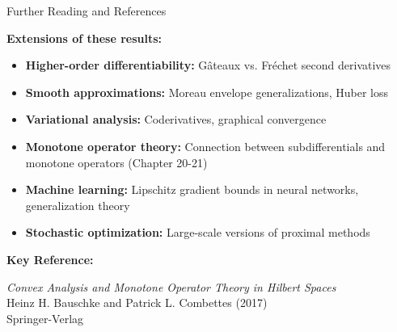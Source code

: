 \documentclass[aspectratio=169,10pt]{beamer}
\theoremstyle{definition}
\begin{document}
\begin{frame}{Further Reading and References}

\textbf{Extensions of these results:}

\begin{itemize}
  \item \textbf{Higher-order differentiability:} Gâteaux vs. Fréchet second derivatives

  \item \textbf{Smooth approximations:} Moreau envelope generalizations, Huber loss

  \item \textbf{Variational analysis:} Coderivatives, graphical convergence

  \item \textbf{Monotone operator theory:} Connection between subdifferentials and
        monotone operators (Chapter 20-21)

  \item \textbf{Machine learning:} Lipschitz gradient bounds in neural networks,
        generalization theory

  \item \textbf{Stochastic optimization:} Large-scale versions of proximal methods
\end{itemize}

\vspace{0.3cm}

\textbf{Key Reference:}

\begin{center}
  \textit{Convex Analysis and Monotone Operator Theory in Hilbert Spaces}\\
  Heinz H. Bauschke and Patrick L. Combettes (2017)\\
  Springer-Verlag
\end{center}

\end{frame}


\appendix
\end{document}
